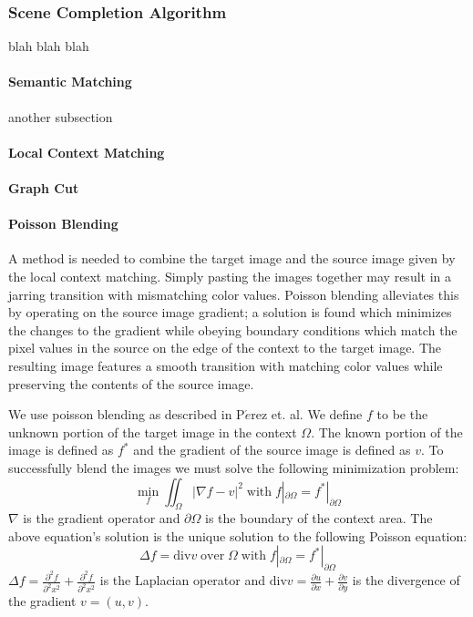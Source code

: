 \documentclass[11pt]{amsart}
\begin{document}
\subsubsection{Scene Completion Algorithm}
blah blah blah

\paragraph{\sc Semantic Matching} 
another subsection

\paragraph{\sc Local Context Matching}

\paragraph{\sc Graph Cut}

\paragraph{\sc Poisson Blending}


A method is needed to combine the target image and the source image given by the local context matching. Simply pasting the images together may result in a jarring transition with mismatching color values. Poisson blending alleviates this by operating on the source image gradient; a solution is found which minimizes the changes to the gradient while obeying boundary conditions which match the pixel values in the source on the edge of the context to the target image. The resulting image features a smooth transition with matching color values while preserving the contents of the source image.


We use poisson blending as described in P$\acute{e}$rez et. al. \cite{Perez:2003} We define $f$ to be the unknown portion of the target image in the context $\Omega$. The known portion of the image is defined as $f^\ast$ and the gradient of the source image is defined as $v$. To successfully blend the images we must solve the following minimization problem:
$$ \min_f \iint_\Omega|\nabla f-v|^{2} \;\mathrm{with}\; f|_{\partial\Omega} = f^{\ast}|_{\partial\Omega} $$
$\nabla$ is the gradient operator and $\partial\Omega$ is the boundary of the context area. The above equation's solution is the unique solution to the following Poisson equation:
$$\Delta f=\mathrm{div} v\;\mathrm{ over }\;\Omega\;\mathrm{  with}\;  f|_{\partial\Omega} = f^{\ast}|_{\partial\Omega}$$
$\Delta f = \frac{\partial^{2} f}{\partial^{2}x^2}+\frac{\partial^{2}f}{\partial^{2}x^2}$ is the Laplacian operator and $\mathrm{div} v = \frac{\partial u}{\partial x}+\frac{\partial v}{\partial y}$ is the divergence of the gradient $v=(u,v)$.
\end{document}
